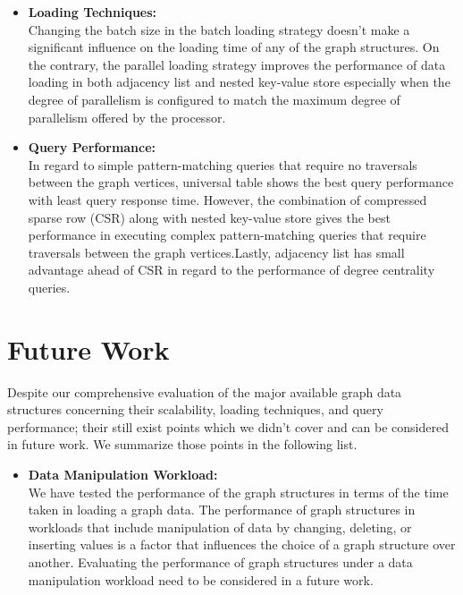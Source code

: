 {\begin{itemize}
\item \textbf{Loading Techniques:}\\
Changing the batch size in the batch loading strategy doesn't make a significant influence on the loading time of any of the graph structures. On the contrary, the parallel loading strategy improves the performance of data loading in both adjacency list and nested key-value store especially when the degree of parallelism is configured to match the maximum degree of parallelism offered by the processor.\\

\item \textbf{Query Performance:}\\
In regard to simple pattern-matching queries that require no traversals between the graph vertices, universal table shows the best query performance with least query response time. However, the combination of compressed sparse row (CSR) along with nested key-value store gives the best performance in executing complex pattern-matching queries that require traversals between the graph vertices.Lastly, adjacency list has small advantage ahead of CSR in regard to the performance of degree centrality queries.\\

\end{itemize}





\section{Future Work}
\label{sec:futureWork}

Despite our comprehensive evaluation of the major available graph data structures concerning their scalability, loading techniques, and query performance; their still exist points which we didn't cover and can be considered in future work. We summarize those points in the following list.

\begin{itemize}  

\item \textbf{Data Manipulation Workload:}\\
We have tested the performance of the graph structures in terms of the time taken in loading a graph data. The performance of graph structures in workloads that include manipulation of data by changing, deleting, or inserting values is a factor that influences the choice of a graph structure over another. Evaluating the performance of graph structures under a data manipulation workload need to be considered in a future work.


\end{itemize}}
